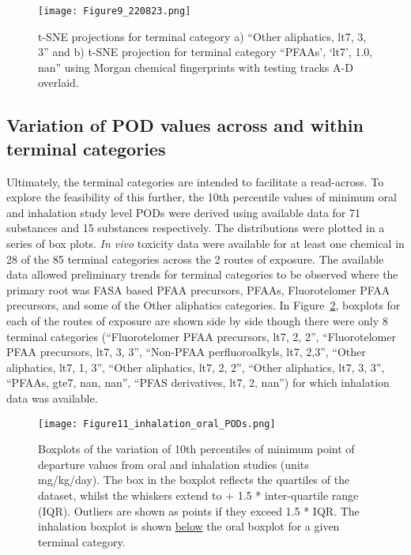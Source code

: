 \documentclass[
  super,
  preprint,
  3p]{elsarticle}
\begin{document}
\begin{figure}

{\centering \texttt{[image: Figure9\_220823.png]}

}

\caption{\label{fig-tsne-physchem}t-SNE projections for terminal
category a) ``Other aliphatics, lt7, 3, 3'' and b) t-SNE projection for
terminal category ``PFAAs', `lt7', 1.0, nan'' using Morgan chemical
fingerprints with testing tracks A-D overlaid.}

\end{figure}

\hypertarget{variation-of-pod-values-across-and-within-terminal-categories}{%
\subsection{Variation of POD values across and within terminal
categories}\label{variation-of-pod-values-across-and-within-terminal-categories}}

Ultimately, the terminal categories are intended to facilitate a
read-across. To explore the feasibility of this further, the 10th
percentile values of minimum oral and inhalation study level PODs were
derived using available data for 71 substances and 15 substances
respectively. The distributions were plotted in a series of box plots.
\emph{In vivo} toxicity data were available for at least one chemical in
28 of the 85 terminal categories across the 2 routes of exposure. The
available data allowed preliminary trends for terminal categories to be
observed where the primary root was FASA based PFAA precursors, PFAAs,
Fluorotelomer PFAA precursors, and some of the Other aliphatics
categories. In Figure~\ref{fig-pods-all}, boxplots for each of the
routes of exposure are shown side by side though there were only 8
terminal categories (``Fluorotelomer PFAA precursors, lt7, 2, 2'',
``Fluorotelomer PFAA precursors, lt7, 3, 3'', ``Non-PFAA
perfluoroalkyls, lt7, 2,3'', ``Other aliphatics, lt7, 1, 3'', ``Other
aliphatics, lt7, 2, 2'', ``Other aliphatics, lt7, 3, 3'', ``PFAAs, gte7,
nan, nan'', ``PFAS derivatives, lt7, 2, nan'') for which inhalation data
was available.

\begin{figure}

{\centering \texttt{[image: Figure11\_inhalation\_oral\_PODs.png]}

}

\caption{\label{fig-pods-all}Boxplots of the variation of 10th
percentiles of minimum point of departure values from oral and
inhalation studies (units mg/kg/day). The box in the boxplot reflects
the quartiles of the dataset, whilst the whiskers extend to + 1.5 *
inter-quartile range (IQR). Outliers are shown as points if they exceed
1.5 * IQR. The inhalation boxplot is shown \ul{below} the oral boxplot
for a given terminal category.}

\end{figure}
\end{document}
